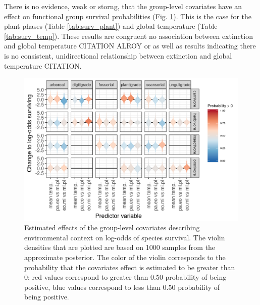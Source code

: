 \documentclass[12pt,letterpaper]{article}
\begin{document}
There is no evidence, weak or storng, that the group-level covariates have an effect on functional group survival probabilities (Fig. \ref{fig:group_surv_bd}). This is the case for the plant phases (Table \ref{tab:surv_plant}) and global temperature (Table \ref{tab:surv_temp}). These results are congruent no association between extinction and global temperature CITATION ALROY or as well as results indicating there is no consistent, unidirectional relationship between extinction and global temperature CITATION. 
\begin{figure}[ht]
  \centering
  \includegraphics[width=\textwidth,height=0.4\textheight,keepaspectratio=true]{figure/group_on_survival_bd}
  \caption{Estimated effects of the group-level covariates describing environmental context on log-odds of species survival. The violin densities that are plotted are based on 1000 samples from the approximate posterior. The color of the violin corresponds to the probability that the covariates effect is estimated to be greater than 0; red values correspond to greater than 0.50 probability of being positive, blue values correspond to less than 0.50 probability of being positive.} 
  \label{fig:group_surv_bd}
\end{figure}
\end{document}
